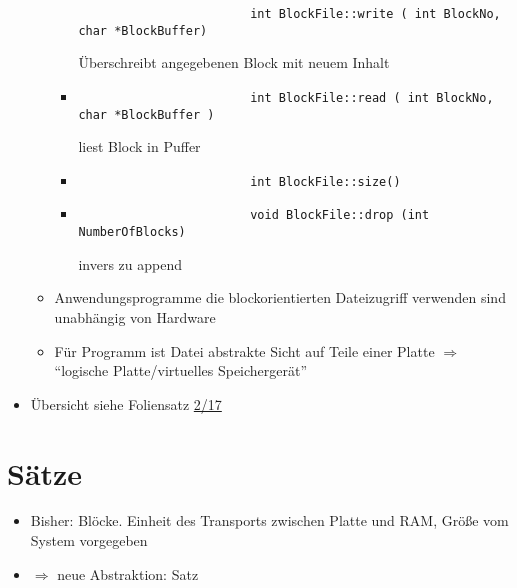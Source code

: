 \documentclass[a4paper, 12pt]{scrartcl}
\begin{document}
\begin{itemize}
\begin{itemize}
\begin{itemize}
						\begin{lstlisting}
						int BlockFile::write ( int BlockNo, char *BlockBuffer)
						\end{lstlisting}
						Überschreibt angegebenen Block mit neuem Inhalt 
					\item
						\begin{lstlisting}
						int BlockFile::read ( int BlockNo, char *BlockBuffer )
						\end{lstlisting}
						liest Block in Puffer
					\item

						\begin{lstlisting}
						int BlockFile::size()
						\end{lstlisting}
					\item
						\begin{lstlisting}
						void BlockFile::drop (int NumberOfBlocks)
						\end{lstlisting}
						invers zu append
				\end{itemize}
			\item
				Anwendungsprogramme die blockorientierten Dateizugriff verwenden sind unabhängig von Hardware
			\item
				Für Programm ist Datei abstrakte Sicht auf Teile einer Platte $\Rightarrow$ \enquote{logische Platte/virtuelles Speichergerät}
		\end{itemize}
	\item
		Übersicht siehe Foliensatz \href{IDB-2015WS-02-Dateiverwaltung.pdf}{2/17}
\end{itemize}

\section{Sätze}
\begin{itemize}
	\item
		Bisher: Blöcke. Einheit des Transports zwischen Platte und RAM, Größe vom System vorgegeben
	\item
		$\Rightarrow$ neue Abstraktion: Satz
\end{itemize}
\end{document}
